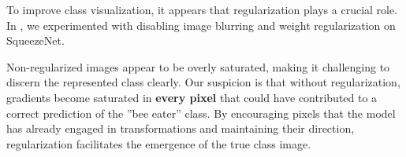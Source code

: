 To improve class visualization, it appears that regularization plays a crucial role. In , we experimented with disabling image blurring and weight regularization on SqueezeNet.%


Non-regularized images appear to be overly saturated, making it challenging to discern the represented class clearly. Our suspicion is that without regularization, gradients become saturated in \textbf{every pixel} that could have contributed to a correct prediction of the ''bee eater'' class. By encouraging pixels that the model has already engaged in transformations and maintaining their direction, regularization facilitates the emergence of the true class image.


